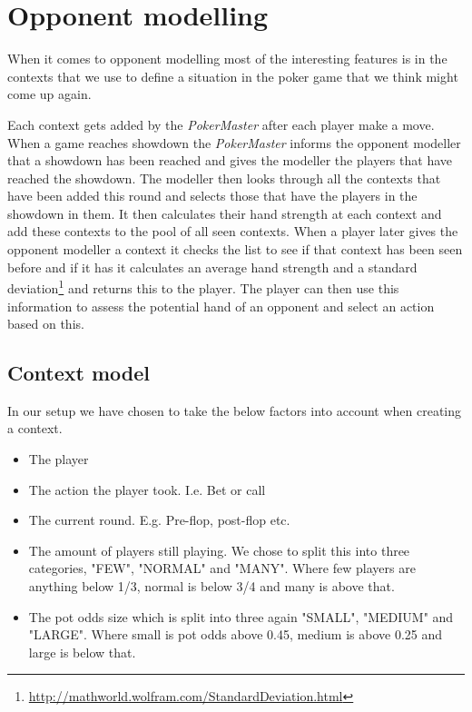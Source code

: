 \documentclass[titlepage, a4paper]{article}
\begin{document}
\section{Opponent modelling}\label{opponent modelling}
When it comes to opponent modelling most of the interesting features is in the
contexts that we use to define a situation in the poker game that we think might
come up again.

Each context gets added by the \textit{PokerMaster} after each
player make a move. When a game reaches showdown the \textit{PokerMaster} informs
the opponent modeller that a showdown has been reached and gives the modeller the
players that have reached the showdown. The modeller then looks through all the 
contexts that have been added this round and selects those that have the players
in the showdown in them. It then calculates their hand strength at each context
and add these contexts to the pool of all seen contexts. When a player later
gives the opponent modeller a context it checks the list to see if that context
has been seen before and if it has it calculates an average hand strength and
a standard deviation\footnote{\url{http://mathworld.wolfram.com/StandardDeviation.html}}
and returns this to the player. The player can then use this information
to assess the potential hand of an opponent and select an action based on this.

\subsection{Context model}\label{context model}
In our setup we have chosen to take the below factors into account when creating
a context.

\begin{itemize}
	\item The player
	\item The action the player took. I.e. Bet or call
	\item The current round. E.g. Pre-flop, post-flop etc.
	\item The amount of players still playing. We chose to split this into
		three categories, "FEW", "NORMAL" and "MANY". Where few players
		are anything below 1/3, normal is below 3/4 and many is above that.
	\item The pot odds size which is split into three again "SMALL", "MEDIUM"
		and "LARGE". Where small is pot odds above 0.45, medium is above
		0.25 and large is below that.
\end{itemize}
\end{document}
